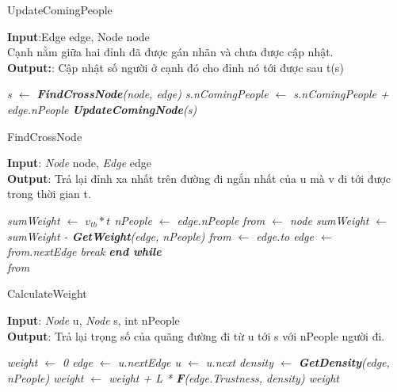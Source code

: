     \begin{algorithm}
        \caption{UpdateComingPeople}
        \textbf{Input}:Edge edge, Node node \\ 
        Cạnh nằm giữa hai đỉnh đã được gán nhãn và chưa được cập nhật. \\
        \textbf{Output:}: Cập nhật số người ở cạnh đó cho đỉnh nó tới được sau t(s)

        \begin{algorithmic}
            \em
            \State s $\gets$ \textbf{FindCrossNode}(node, edge)
            \State s.nComingPeople $\gets$ s.nComingPeople + edge.nPeople
            \State \textbf{UpdateComingNode}(s)
            \EndProcedure
        \end{algorithmic}
    \end{algorithm}
    
    \begin{algorithm}
        \caption{FindCrossNode}
        \textbf{Input}: \textit{Node} node, \textit{Edge} edge\\
        \textbf{Output}: Trả lại đỉnh xa nhất trên đường đi ngắn nhất của u mà v 
        đi tới được trong thời gian t.
        \begin{algorithmic}
            \em
            \State sumWeight $\gets$ $v_{tb}*t$ 
            \State nPeople $\gets$ edge.nPeople
            \State from $\gets$ node
            \State sumWeight $\gets$ sumWeight - \textbf{GetWeight}(edge, nPeople)
            \State from $\gets$ edge.to
            \State edge $\gets$ from.nextEdge
             break
            \EndIf
            \EndWhile 
            \textbf{end while} \\
            \Return from
            \EndProcedure
        \end{algorithmic}
    \end{algorithm}

    \begin{algorithm}
        \caption{CalculateWeight}
        \textbf{Input}: \textit{Node} u, \textit{Node} s, int nPeople \\
        \textbf{Output}: Trả lại trọng số của quãng đường đi từ u tới s với 
        nPeople người đi.
        \begin{algorithmic}
            \em
            \State weight $\gets$ 0
            \State edge $\gets$ u.nextEdge
            \State u $\gets$ u.next
            \State density $\gets$ \textbf{GetDensity}(edge, nPeople)
            \State weight $\gets$ weight + L * \textbf{F}(edge.Trustness, density)
            \EndWhile
            \Return weight
            \EndProcedure
        \end{algorithmic}
    \end{algorithm}

